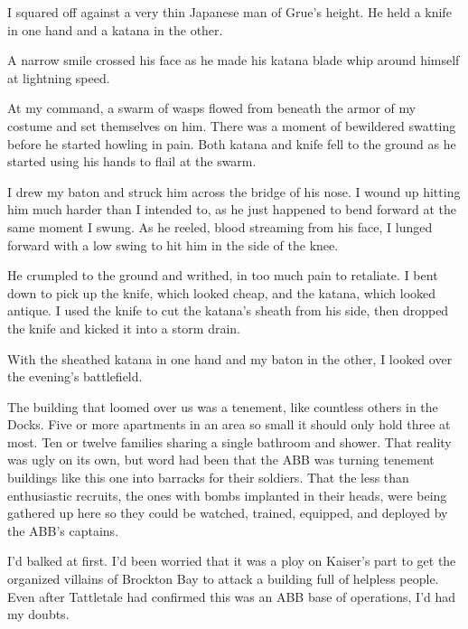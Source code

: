 





I squared off against a very thin Japanese man of Grue's height.  He held a knife in one hand and a katana in the other.



A narrow smile crossed his face as he made his katana blade whip around himself at lightning speed.



At my command, a swarm of wasps flowed from beneath the armor of my costume and set themselves on him.  There was a moment of bewildered swatting before he started howling in pain.  Both katana and knife fell to the ground as he started using his hands to flail at the swarm.



I drew my baton and struck him across the bridge of his nose.  I wound up hitting him much harder than I intended to, as he just happened to bend forward at the same moment I swung.  As he reeled, blood streaming from his face, I lunged forward with a low swing to hit him in the side of the knee.



He crumpled to the ground and writhed, in too much pain to retaliate.  I bent down to pick up the knife, which looked cheap, and the katana, which looked antique.  I used the knife to cut the katana's sheath from his side, then dropped the knife and kicked it into a storm drain.



With the sheathed katana in one hand and my baton in the other, I looked over the evening's battlefield.



The building that loomed over us was a tenement, like countless others in the Docks.  Five or more apartments in an area so small it should only hold three at most.  Ten or twelve families sharing a single bathroom and shower.  That reality was ugly on its own, but word had been that the ABB was turning tenement buildings like this one into barracks for their soldiers.  That the less than enthusiastic recruits, the ones with bombs implanted in their heads, were being gathered up here so they could be watched, trained, equipped, and deployed by the ABB's captains.



I'd balked at first.  I'd been worried that it was a ploy on Kaiser's part to get the organized villains of Brockton Bay to attack a building full of helpless people.  Even after Tattletale had confirmed this was an ABB base of operations, I'd had my doubts.



